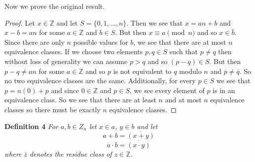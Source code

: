 \documentclass{article}
\begin{document}
\begin{flushleft}
Now we prove the original result.

\begin{proof}
Let $x \in \mathbb{Z}$ and let $S = \{0, 1, \dots , n\}$. Then we see that $x = an+b$ and $x-b=an$ for some $a \in \mathbb{Z}$ and $b \in S$. But then $x \equiv a \pmod{n}$ and so $x \in \overline{b}$. Since there are only $n$ possible values for $b$, we see that there are at most $n$ equivalence classes. If we choose two elements $p,q \in S$ such that $p \neq q$ then without loss of generality we can assume $p>q$ and so $(p-q) \in S$. But then $p-q \neq an$ for some $a \in \mathbb{Z}$ and so $p$ is not equivalent to $q$ modulo $n$ and $\overline{p} \neq \overline{q}$. So no two equivalence classes are the same. Additionally, for every $p \in S$ we see that $p = n(0) + p$ and since $0 \in \mathbb{Z}$ and $p \in S$, we see every element of $p$ is in an equivalence class. So we see that there are at least $n$ and at most $n$ equivalence classes so there must be exactly $n$ equivalence classes.
\end{proof}


\textbf{Definition 4}
\textsl{For $a,b \in Z_n$ let $x \in a$, $y \in b$ and let
\[
a+b = \overline{(x+y)}
\]
\[
a \cdot b = \overline{(x \cdot y)}
\]
where $\overline{z}$ denotes the residue class of $z \in \mathbb{Z}$.}\newline


\end{flushleft}
\end{document}
